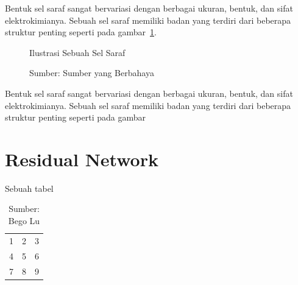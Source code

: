 Bentuk sel saraf sangat bervariasi dengan berbagai ukuran, bentuk, dan sifat elektrokimianya. Sebuah
sel saraf memiliki badan yang terdiri dari beberapa struktur penting seperti pada
gambar~\ref{fig:selsaraf}.

\begin{figure}[h]
  \begin{center}
  \end{center}
  \vspace{-20pt}
  \captionsetup{labelfont=bf, textfont=bf}
  \caption{Ilustrasi Sebuah Sel Saraf}
  \vspace{-10pt}
  \captionsetup{labelfont=md, textfont=md}
  \caption*{Sumber: Sumber yang Berbahaya}
  \label{fig:selsaraf}
\end{figure}

Bentuk sel saraf sangat bervariasi dengan berbagai ukuran, bentuk, dan sifat elektrokimianya. Sebuah
sel saraf memiliki badan yang terdiri dari beberapa struktur penting seperti pada gambar



\section{Residual Network \label{sec:2-ResidualNetwork}}

\begin{table}[h]
  \captionsetup{labelfont=bf, textfont=bf}
  \caption{Sebuah tabel}
  \vspace{-20pt}
  \begin{center}
    \begin{tabular}{| l c r |}
      \hline
      1 & 2 & 3 \\
      4 & 5 & 6 \\
      7 & 8 & 9 \\
      \hline
    \end{tabular}
  \end{center}
  \vspace{-10pt}
  \captionsetup{labelfont=md, textfont=md}
  \caption*{Sumber: Bego Lu}
\end{table}


